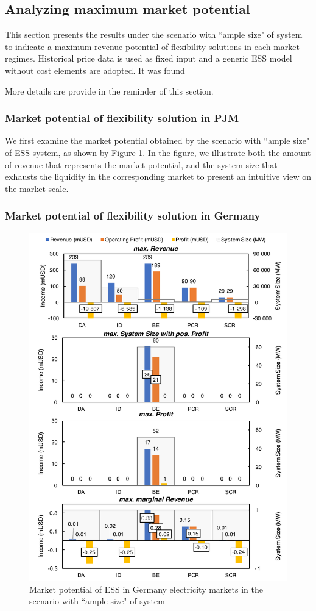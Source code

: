\subsection{Analyzing maximum market potential}
This section presents the results under the scenario with ``ample size" of system to indicate a maximum revenue potential of flexibility solutions in each market regimes. Historical price data is used as fixed input and a generic ESS model without cost elements are adopted. It was found

More details are provide in the reminder of this section.

\subsubsection{Market potential of flexibility solution in PJM}
We first examine the market potential obtained by the scenario with ``ample size" of ESS system, as shown by Figure \ref{fig:germany-ess}. In the figure, we illustrate both the amount of revenue that represents the market potential, and the system size that exhausts the liquidity in the corresponding market to present an intuitive view on the market scale.

\subsubsection{Market potential of flexibility solution in Germany}



\begin{figure}[h!]
	\centering
	\includegraphics[width=0.9\linewidth]{Figures/Germany_ESS}
	\caption{Market potential of ESS in Germany electricity markets in the scenario with ``ample size" of system}
	\label{fig:germany-ess}
\end{figure}

